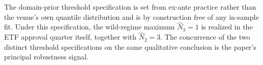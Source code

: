 The domain-prior threshold specification is set from ex-ante
practice rather than the venue's own quantile distribution and is
by construction free of any in-sample fit. Under this
specification, the wild-regime maximum $\hat N_3 = 1$ is realized
in the ETF approval quarter itself, together with $\hat N_2 = 3$.
The concurrence of the two distinct threshold specifications on
the same qualitative conclusion is the paper's principal
robustness signal.


